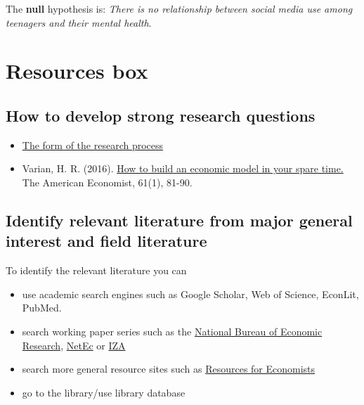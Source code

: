 \documentclass[
]{book}
\providecommand{\tightlist}{%
  \setlength{\itemsep}{0pt}\setlength{\parskip}{0pt}}
\begin{document}
The \textbf{null} hypothesis is: \emph{There is no relationship between
social media use among teenagers and their mental health}.

\hypertarget{resources-box-1}{%
\section{Resources box}\label{resources-box-1}}

\hypertarget{how-to-develop-strong-research-questions}{%
\subsection{How to develop strong research
questions}\label{how-to-develop-strong-research-questions}}

\begin{itemize}
\tightlist
\item
  \href{https://www.economicsnetwork.ac.uk/handbook/ugresearch/31}{The
  form of the research process}
\item
  Varian, H. R. (2016).
  \href{https://journals.sagepub.com/doi/pdf/10.1177/0569434515627089}{How
  to build an economic model in your spare time.} The American
  Economist, 61(1), 81-90.
\end{itemize}

\hypertarget{identify-relevant-literature-from-major-general-interest-and-field-literature}{%
\subsection{Identify relevant literature from major general interest and
field
literature}\label{identify-relevant-literature-from-major-general-interest-and-field-literature}}

To identify the relevant literature you can

\begin{itemize}
\tightlist
\item
  use academic search engines such as Google Scholar, Web of Science,
  EconLit, PubMed. 
\item
  search working paper series such as the \href{www.nber.org}{National
  Bureau of Economic Research},
  \href{http://netec.wustl.edu/NetEc.html}{NetEc} or
  \href{www.iza.org}{IZA}
\item
  search more general resource sites such as
  \href{http://rfe.org}{Resources for Economists}
\item
  go to the library/use library database
\end{itemize}
\end{document}
